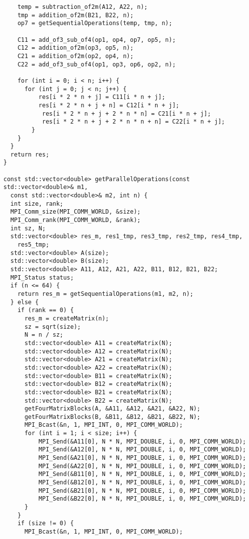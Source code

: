 \documentclass{report}
\begin{document}
\begin{lstlisting}
    temp = subtraction_of2m(A12, A22, n);
    tmp = addition_of2m(B21, B22, n);
    op7 = getSequentialOperations(temp, tmp, n);

    C11 = add_of3_sub_of4(op1, op4, op7, op5, n);
    C12 = addition_of2m(op3, op5, n);
    C21 = addition_of2m(op2, op4, n);
    C22 = add_of3_sub_of4(op1, op3, op6, op2, n);

    for (int i = 0; i < n; i++) {
      for (int j = 0; j < n; j++) {
          res[i * 2 * n + j] = C11[i * n + j];
          res[i * 2 * n + j + n] = C12[i * n + j];
           res[i * 2 * n + j + 2 * n * n] = C21[i * n + j];
           res[i * 2 * n + j + 2 * n * n + n] = C22[i * n + j];
        }
    }
  }
  return res;
}

const std::vector<double> getParallelOperations(const std::vector<double>& m1,
  const std::vector<double>& m2, int n) {
  int size, rank;
  MPI_Comm_size(MPI_COMM_WORLD, &size);
  MPI_Comm_rank(MPI_COMM_WORLD, &rank);
  int sz, N;
  std::vector<double> res_m, res1_tmp, res3_tmp, res2_tmp, res4_tmp,
    res5_tmp;
  std::vector<double> A(size);
  std::vector<double> B(size);
  std::vector<double> A11, A12, A21, A22, B11, B12, B21, B22;
  MPI_Status status;
  if (n <= 64) {
    return res_m = getSequentialOperations(m1, m2, n);
  } else {
    if (rank == 0) {
      res_m = createMatrix(n);
      sz = sqrt(size);
      N = n / sz;
      std::vector<double> A11 = createMatrix(N);
      std::vector<double> A12 = createMatrix(N);
      std::vector<double> A21 = createMatrix(N);
      std::vector<double> A22 = createMatrix(N);
      std::vector<double> B11 = createMatrix(N);
      std::vector<double> B12 = createMatrix(N);
      std::vector<double> B21 = createMatrix(N);
      std::vector<double> B22 = createMatrix(N);
      getFourMatrixBlocks(A, &A11, &A12, &A21, &A22, N);
      getFourMatrixBlocks(B, &B11, &B12, &B21, &B22, N);
      MPI_Bcast(&n, 1, MPI_INT, 0, MPI_COMM_WORLD);
      for (int i = 1; i < size; i++) {
          MPI_Send(&A11[0], N * N, MPI_DOUBLE, i, 0, MPI_COMM_WORLD);
          MPI_Send(&A12[0], N * N, MPI_DOUBLE, i, 0, MPI_COMM_WORLD);
          MPI_Send(&A21[0], N * N, MPI_DOUBLE, i, 0, MPI_COMM_WORLD);
          MPI_Send(&A22[0], N * N, MPI_DOUBLE, i, 0, MPI_COMM_WORLD);
          MPI_Send(&B11[0], N * N, MPI_DOUBLE, i, 0, MPI_COMM_WORLD);
          MPI_Send(&B12[0], N * N, MPI_DOUBLE, i, 0, MPI_COMM_WORLD);
          MPI_Send(&B21[0], N * N, MPI_DOUBLE, i, 0, MPI_COMM_WORLD);
          MPI_Send(&B22[0], N * N, MPI_DOUBLE, i, 0, MPI_COMM_WORLD);
      }
    }
    if (size != 0) {
      MPI_Bcast(&n, 1, MPI_INT, 0, MPI_COMM_WORLD);

\end{lstlisting}
\end{document}

